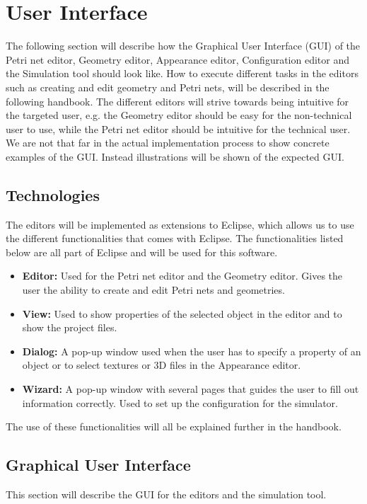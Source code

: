 \documentclass[fontsize=12pt, paper=a4]{article}
\begin{document}
\section{User Interface}
The following section will describe how the Graphical User Interface (GUI) of the Petri net editor, Geometry editor, Appearance editor, Configuration editor and the Simulation tool should look like. How to execute different tasks in the editors such as creating and edit geometry and Petri nets, will be described in the following handbook. The different editors will strive towards being intuitive for the targeted user, e.g. the Geometry editor should be easy for the non-technical user to use, while the Petri net editor should be intuitive for the technical user. 
We are not that far in the actual implementation process to show concrete examples of the GUI. Instead illustrations will be shown of the expected GUI. 

\subsection{Technologies}
The editors will be implemented as extensions to Eclipse, which allows us to use the different functionalities that comes with Eclipse. The functionalities listed below are all part of Eclipse and will be used for this software.

\begin{itemize}
\item{\textbf{Editor:} Used for the Petri net editor and the Geometry editor. Gives the user the ability to create and edit Petri nets and geometries.}
\item{\textbf{View:} Used to show properties of the selected object in the editor and to show the project files.}
\item{\textbf{Dialog:} A pop-up window used when the user has to specify a property of an object or to select textures or 3D files in the Appearance editor.}
\item{\textbf{Wizard:} A pop-up window with several pages that guides the user to fill out information correctly. Used to set up the configuration for the simulator.}
\end{itemize}

The use of these functionalities will all be explained further in the handbook. 

\subsection{Graphical User Interface}
This section will describe the GUI for the editors and the simulation tool. 
\end{document}
